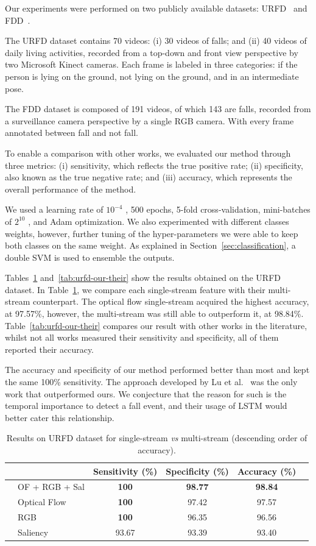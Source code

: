 \documentclass[conference]{IEEEtran}
\begin{document}
Our experiments were performed on two publicly available
datasets: URFD~\cite{kepski2014human} and FDD~\cite{charfi2013optimised}.\par
The URFD dataset contains 70 videos: (i) 30 videos of falls; and (ii) 40 videos of daily living activities, recorded from a top-down and front view perspective by two Microsoft Kinect cameras. Each frame is labeled in three categories: if the person is lying on the ground, not lying on the ground, and in an intermediate pose.\par
The FDD dataset is composed of 191 videos, of which 143 are falls, recorded from a surveillance camera perspective by a single RGB camera. With every frame annotated between fall and not fall.\par
To enable a comparison with other works, we evaluated our method through three metrics: (i) sensitivity, which reflects the true positive rate; (ii) specificity, also known as the true negative rate; and (iii) accuracy, which represents the overall performance of the method.\par
We used a learning rate of $10^{−4}$ , 500 epochs, 5-fold cross-validation, mini-batches of $2^{10}$ , and Adam optimization. We also experimented with different classes weights, however, further tuning of the hyper-parameters we were able to keep both classes on the same weight. As explained in Section~\ref{sec:classification}, a double SVM is used to ensemble the outputs.\par
Tables~\ref{tab:urfd-ensem} and~\ref{tab:urfd-our-their} show the results obtained on the URFD dataset. In Table~\ref{tab:urfd-ensem}, we compare each single-stream feature with their multi-stream counterpart. The optical flow single-stream acquired the highest accuracy, at 97.57\%, however, the multi-stream was still able to outperform it, at 98.84\%. Table~\ref{tab:urfd-our-their} compares our result with other works in the literature, whilst not all works measured their sensitivity and specificity, all of them reported their accuracy.\par
The accuracy and specificity of our method performed better than most and kept the same 100\% sensitivity. The approach developed by Lu et al.~\cite{lu2018deep} was the only work that outperformed ours. We conjecture that the reason for such is the temporal importance to detect a fall event, and their usage of LSTM would better cater this relationship.\par
\begin{table}[]
\centering
\caption{Results on URFD dataset for single-stream \textit{vs} multi-stream (descending order of accuracy).}
\label{tab:urfd-ensem}
\begin{tabular}{llcccl}
\hline
 &  & Sensitivity (\%) & Specificity (\%) & Accuracy (\%) &  \\ \hline
 & OF + RGB + Sal & \textbf{100} & \textbf{98.77} & \textbf{98.84} &  \\
 & Optical Flow & \textbf{100} & 97.42 & 97.57 &  \\
 & RGB & \textbf{100} & 96.35 & 96.56 &  \\
 & Saliency & 93.67 & 93.39 & 93.40 &  \\ \hline
\end{tabular}
\end{table}
\end{document}
